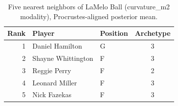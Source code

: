 \begin{table}[htbp]
  \centering\small
  \begin{tabular}{rllc}
    \toprule
    Rank & Player & Position & Archetype \\
    \midrule
    1 & Daniel Hamilton & G & 3 \\
    2 & Shayne Whittington & F & 3 \\
    3 & Reggie Perry & F & 2 \\
    4 & Leonard Miller & F & 3 \\
    5 & Nick Fazekas & F & 3 \\
    \bottomrule
  \end{tabular}
  \caption{Five nearest neighbors of LaMelo Ball (curvature_m2 modality), Procrustes-aligned posterior mean.}
  \label{tab:LaMelo_Ball_neighbors_curvature_m2}
\end{table}

